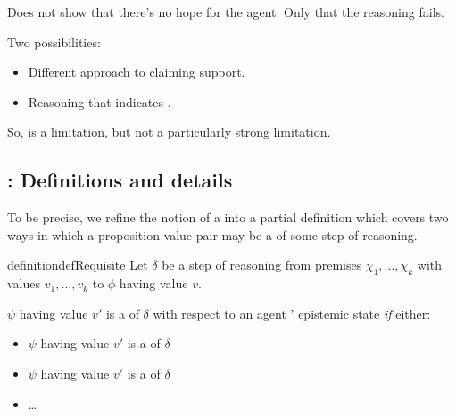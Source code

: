 \begin{note}
  Does not show that there's no hope for the agent.
  Only that the reasoning fails.

  Two possibilities:
  \begin{itemize}
  \item Different approach to claiming support.
  \item Reasoning that indicates \crequ{}.
  \end{itemize}

  So, \ideaCS{} is a limitation, but not a particularly strong limitation.
\end{note}

\subsection{: Definitions and details}
\label{sec:requ3}
\label{sec:ideaCS:requ:details}


\begin{note}
  To be precise, we refine the notion of a \requ{} into a partial definition which covers two ways in which a proposition-value pair may be a \requ{} of some step of reasoning.

  \begin{restatable}{definition}{defRequisite}
    \label{def:requ}
    Let \(\delta\) be a step of reasoning from premises \(\chi_{1},\dots,\chi_{k}\) with values \(v_{1},\dots,v_{k}\) to \(\phi\) having value \(v\).

    \(\psi\) having value \(v'\) is a \emph{\requ{}} of \(\delta\) with respect to an agent \vAgent{}' epistemic state \emph{if} either:
    \begin{itemize}
    \item \(\psi\) having value \(v'\) is a \emph{\crequ{}} of \(\delta\)
    \item \(\psi\) having value \(v'\) is a \emph{\prequ{}} of \(\delta\)
    \item \dots
    \end{itemize}
  \end{restatable}
\end{note}

